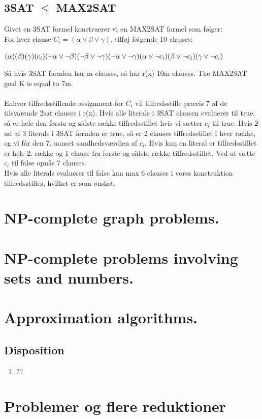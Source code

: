 \documentclass{article}
\begin{document}
\subsection{3SAT $\le$ MAX2SAT}
Givet en 3SAT formel konstruerer vi en MAX2SAT formel som følger: 
\\
For hver clause $C_i = (\alpha \lor \beta \lor \gamma)$, tilføj følgende 10 clauses:
\begin{center}
    $(\alpha)(\beta)(\gamma)(c_i)\\
    (\lnot \alpha \lor \lnot \beta)(\lnot \beta \lor \lnot \gamma)(\lnot \alpha \lor \lnot \gamma)\\
    (\alpha \lor \lnot c_i)(\beta \lor \lnot c_i)(\gamma \lor \lnot c_i)$
\end{center}
Så hvis 3SAT formlen har m clauses, så har r(x) 10m clauses. The MAX2SAT goal K is equal to 7m.\\\\
Enhver tilfredsstillende assignment for $C_i$ vil tilfredsstille præcis 7 af de tilsvarende 2sat clauses i r(x). Hvis alle literals i 3SAT clausen evaluerer til true, så er hele den første og sidste række tilfredsstillet hvis vi sætter $c_i$ til true. Hvis 2 ud af 3 literals i 3SAT formlen er true, så er 2 clauses tilfredsstillet i hver række, og vi får den 7. uanset sandhedsværdien af $c_i$. Hvis kun en literal er tilfredsstillet er hele 2. række og 1 clause fra første og sidste række tilfredsstillet. Ved at sætte $c_i$ til false opnås 7 clauses.\\
Hvis alle literals evaluerer til false kan max 6 clauses i vores konstruktion tilfredsstilles, hvilket er som ønsket. 
\newpage
\section{NP-complete graph problems.}


\newpage

\section{NP-complete problems involving sets and numbers.}


\newpage

\section{Approximation algorithms.}
\subsection{Disposition}
\begin{enumerate}
    \item ??
\end{enumerate}
\newpage
\section{Problemer og flere reduktioner}

\end{document}
